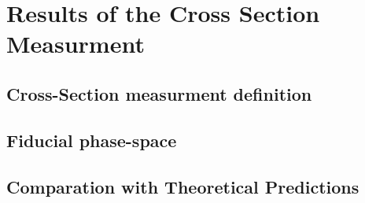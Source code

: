 \chapter{Results of the Cross Section Measurment}
\section{Cross-Section measurment definition}
\section{Fiducial phase-space}
\section{Comparation with Theoretical Predictions}